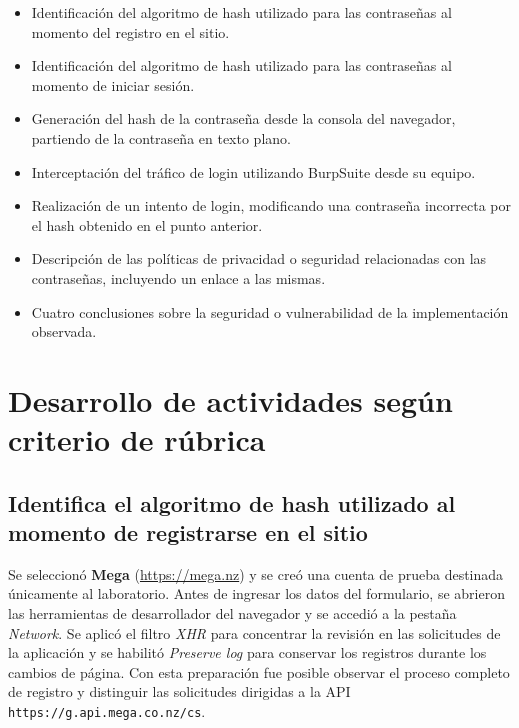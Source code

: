 \documentclass[letter,12pt]{article}
\newcommand{\sangria}{\hspace*{1.25cm}} %
\begin{document}
\begin{itemize}
    \item Identificación del algoritmo de hash utilizado para las contraseñas al momento del registro en el sitio.

    \item Identificación del algoritmo de hash utilizado para las contraseñas al momento de iniciar sesión.

    \item Generación del hash de la contraseña desde la consola del navegador, partiendo de la contraseña en texto plano.

    \item Interceptación del tráfico de login utilizando BurpSuite desde su equipo.

    \item Realización de un intento de login, modificando una contraseña incorrecta por el hash obtenido en el punto anterior.

    \item Descripción de las políticas de privacidad o seguridad relacionadas con las contraseñas, incluyendo un enlace a las mismas.

    \item Cuatro conclusiones sobre la seguridad o vulnerabilidad de la implementación observada.

\end{itemize}

\section{Desarrollo de actividades según criterio de rúbrica}

\subsection{Identifica el algoritmo de hash utilizado al momento de registrarse en el sitio}
\label{sec:registro}

\sangria Se seleccionó \textbf{Mega} (\url{https://mega.nz}) y se creó una cuenta de prueba destinada únicamente al laboratorio. Antes de ingresar los datos del formulario, se abrieron las herramientas de desarrollador del navegador y se accedió a la pestaña \textit{Network}. Se aplicó el filtro \textit{XHR} para concentrar la revisión en las solicitudes de la aplicación y se habilitó \textit{Preserve log} para conservar los registros durante los cambios de página. Con esta preparación fue posible observar el proceso completo de registro y distinguir las solicitudes dirigidas a la API \texttt{https://g.api.mega.co.nz/cs}.
\end{document}

